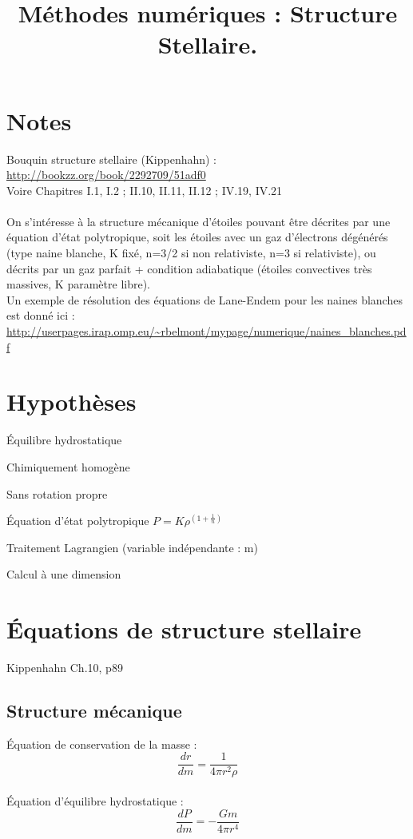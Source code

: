 \documentclass[a4paper,10pt]{article}
\begin{document}
\title{Méthodes numériques : Structure Stellaire.}
\maketitle
\tableofcontents

\section*{Notes}
Bouquin structure stellaire (Kippenhahn) :\\
\url{http://bookzz.org/book/2292709/51adf0}\\
Voire Chapitres I.1, I.2 ; II.10, II.11, II.12 ; IV.19, IV.21\\
\\
On s'intéresse à la structure mécanique d'étoiles pouvant être décrites par une équation d'état polytropique, soit les étoiles avec un gaz d'électrons dégénérés (type naine blanche, K fixé, n=3/2 si non relativiste, n=3 si relativiste), ou décrits par un gaz parfait + condition adiabatique (étoiles convectives très massives, K paramètre libre).\\
Un exemple de résolution des équations de Lane-Endem pour les naines blanches est donné ici : \url{http://userpages.irap.omp.eu/~rbelmont/mypage/numerique/naines_blanches.pdf}

\newpage
\section{Hypothèses}
\begin{list}{•}{}
\item Équilibre hydrostatique
\item Chimiquement homogène
\item Sans rotation propre
\item Équation d'état polytropique $ P = K \rho^{(1+\frac{1}{n})} $
\item Traitement Lagrangien (variable indépendante : m)
\item Calcul à une dimension
\end{list}

\section{Équations de structure stellaire}
Kippenhahn Ch.10, p89
\subsection{Structure mécanique}
Équation de conservation de la masse :
\begin{equation}
\frac{d r}{d m} = \frac{1}{4 \pi r^2 \rho}
\end{equation}
\\
Équation d'équilibre hydrostatique : 
\begin{equation}
\frac{d P}{d m} = - \frac{G m}{4 \pi r^4}
\end{equation}
\end{document}
